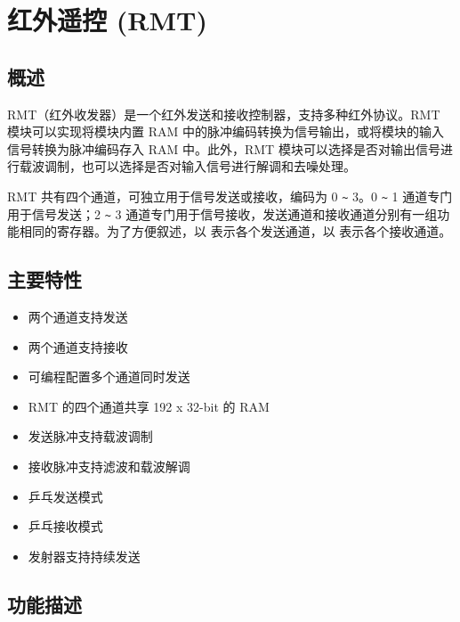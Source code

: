 \documentclass[main\_\_CN.tex]{subfiles}
\begin{document}

\ifglobal
\else
    {\let\clearpage\relax \listoftodos}
    \tableofcontents
\fi


\hypertarget{rmt}{}
\chapter{红外遥控 (RMT)}
\label{mod:rmt}


\section{概述}
RMT（红外收发器）是一个红外发送和接收控制器，支持多种红外协议。RMT 模块可以实现将模块内置 RAM 中的脉冲编码转换为信号输出，或将模块的输入信号转换为脉冲编码存入 RAM 中。此外，RMT 模块可以选择是否对输出信号进行载波调制，也可以选择是否对输入信号进行解调和去噪处理。

RMT 共有四个通道，可独立用于信号发送或接收，编码为 0 \verb+~+ 3。0 \verb+~+ 1 通道专门用于信号发送；2 \verb+~+ 3 通道专门用于信号接收，发送通道和接收通道分别有一组功能相同的寄存器。为了方便叙述，以  表示各个发送通道，以  表示各个接收通道。

\section{主要特性}
\begin{itemize}
\item 两个通道支持发送
\item 两个通道支持接收
\item 可编程配置多个通道同时发送
\item RMT 的四个通道共享 192 x 32-bit 的 RAM
\item 发送脉冲支持载波调制
\item 接收脉冲支持滤波和载波解调
\item 乒乓发送模式
\item 乒乓接收模式
\item 发射器支持持续发送
\end{itemize}

\section{功能描述}
\end{document}
